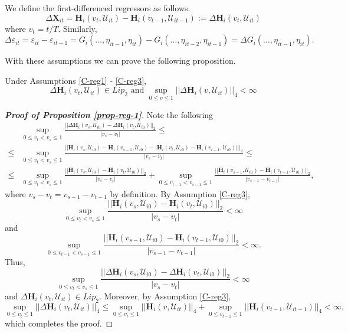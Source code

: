 \documentclass[a4paper,12pt]{article}
\begin{document}
We define the first-differenced regressors as follows.
\[ \Delta \mathbf{X}_{it} =\mathbf{H}_i(v_t, \mathcal{U}_{it}) - \mathbf{H}_i(v_{t-1}, \mathcal{U}_{it-1}) := \Delta \mathbf{H}_i(v_t, \mathcal{U}_{it}) \]
where $v_t = t/T$. Similarly, 
\[\Delta \varepsilon_{it} = \varepsilon_{it} - \varepsilon_{it-1} = G_i(\ldots, \eta_{it-1}, \eta_{it}) - G_i(\ldots, \eta_{it-2}, \eta_{it-1}) = \Delta G_i(\ldots, \eta_{it-1}, \eta_{it}).
\]
 
With these assumptions we can prove the following proposition.
\begin{prop}\label{prop-reg-1}
Under Assumptions \ref{C-reg1} - \ref{C-reg3},
\[ \Delta \mathbf{H}_i(v_t, \mathcal{U}_{it}) \in Lip_2 \text{ and } \sup_{0\leq v \leq 1} || \Delta \mathbf{H}_i(v, \mathcal{U}_{it})||_4 < \infty
\]
\end{prop}

\begin{proof}[\textnormal{\textbf{Proof of Proposition \ref{prop-reg-1}}}]
Note the following 
\begin{align*}
&\sup_{0\leq v_t < v_s \leq 1} \frac{||\Delta \mathbf{H}_i(v_s, \mathcal{U}_{i0}) - \Delta \mathbf{H}_i(v_t, \mathcal{U}_{i0}) ||_2}{|v_s - v_t|} \leq \\
\leq &\sup_{0\leq v_t < v_s \leq 1} \frac{||\mathbf{H}_i(v_s, \mathcal{U}_{i0}) - \mathbf{H}_i(v_{s-1}, \mathcal{U}_{i0}) - |\mathbf{H}_i(v_t, \mathcal{U}_{i0}) - \mathbf{H}_i(v_{t-1}, \mathcal{U}_{i0})| ||_2}{|v_s - v_t|} \leq\\
\leq &\sup_{0\leq v_t < v_s \leq 1} \frac{||\mathbf{H}_i(v_s, \mathcal{U}_{i0}) - \mathbf{H}_i(v_t, \mathcal{U}_{i0}) ||_2}{|v_s - v_t|} + \sup_{0\leq v_{t-1} < v_{s-1} \leq 1} \frac{||\mathbf{H}_i(v_{s-1}, \mathcal{U}_{i0}) - \mathbf{H}_i(v_{t-1}, \mathcal{U}_{i0}) ||_2}{|v_{s-1} - v_{t-1}|},
\end{align*}
where $v_s - v_t = v_{s-1} - v_{t-1}$ by definition. By Assumption \ref{C-reg3},
\[\sup_{0\leq v_t < v_s \leq 1} \frac{||\mathbf{H}_i(v_s, \mathcal{U}_{i0}) - \mathbf{H}_i(v_t, \mathcal{U}_{i0}) ||_2}{|v_s - v_t|} < \infty
\]
and 
\[\sup_{0\leq v_{t-1} < v_{s-1} \leq 1} \frac{||\mathbf{H}_i(v_{s-1}, \mathcal{U}_{i0}) - \mathbf{H}_i(v_{t-1}, \mathcal{U}_{i0}) ||_2}{|v_{s-1} - v_{t-1}|} < \infty.
\]
Thus, 
\[
\sup_{0\leq v_t < v_s \leq 1} \frac{||\Delta \mathbf{H}_i(v_s, \mathcal{U}_{i0}) - \Delta \mathbf{H}_i(v_t, \mathcal{U}_{i0}) ||_2}{|v_s - v_t|} < \infty
\]
and $\Delta \mathbf{H}_i(v_t, \mathcal{U}_{it}) \in Lip_2$. Moreover, by Assumption \ref{C-reg3},
\[
 \sup_{0\leq v_t \leq 1} || \Delta \mathbf{H}_i(v_t, \mathcal{U}_{it})||_4 \leq  \sup_{0\leq v_t \leq 1} ||\mathbf{H}_i(v, \mathcal{U}_{it})||_4 +  \sup_{0\leq v_{t-1} \leq 1} || \mathbf{H}_i(v_{t-1}, \mathcal{U}_{it-1})||_4 < \infty,
\]
which completes the proof.
\end{proof} 
\end{document}
